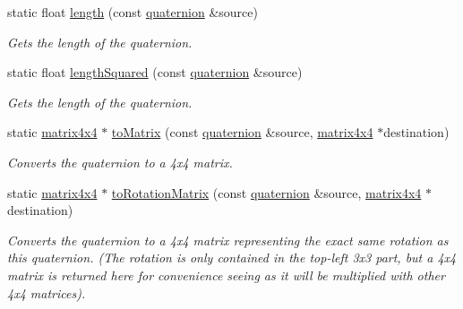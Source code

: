 \begin{DoxyCompactItemize}
static float \hyperlink{classflounder_1_1quaternion_a2b802d5ca0ff8a010f5b3c57a86706f8}{length} (const \hyperlink{classflounder_1_1quaternion}{quaternion} \&source)
\begin{DoxyCompactList}\small\item\em Gets the length of the quaternion. \end{DoxyCompactList}\item 
static float \hyperlink{classflounder_1_1quaternion_a5e67f0dc71eeefd2b76788df0157cbd0}{length\+Squared} (const \hyperlink{classflounder_1_1quaternion}{quaternion} \&source)
\begin{DoxyCompactList}\small\item\em Gets the length of the quaternion. \end{DoxyCompactList}\item 
static \hyperlink{classflounder_1_1matrix4x4}{matrix4x4} $\ast$ \hyperlink{classflounder_1_1quaternion_a229c673de0638993dae852f4027bb38b}{to\+Matrix} (const \hyperlink{classflounder_1_1quaternion}{quaternion} \&source, \hyperlink{classflounder_1_1matrix4x4}{matrix4x4} $\ast$destination)
\begin{DoxyCompactList}\small\item\em Converts the quaternion to a 4x4 matrix. \end{DoxyCompactList}\item 
static \hyperlink{classflounder_1_1matrix4x4}{matrix4x4} $\ast$ \hyperlink{classflounder_1_1quaternion_a27a4276b67f349b8cd79905bbd0c7ae4}{to\+Rotation\+Matrix} (const \hyperlink{classflounder_1_1quaternion}{quaternion} \&source, \hyperlink{classflounder_1_1matrix4x4}{matrix4x4} $\ast$destination)
\begin{DoxyCompactList}\small\item\em Converts the quaternion to a 4x4 matrix representing the exact same rotation as this quaternion. (The rotation is only contained in the top-\/left 3x3 part, but a 4x4 matrix is returned here for convenience seeing as it will be multiplied with other 4x4 matrices). \end{DoxyCompactList}\end{DoxyCompactItemize}
